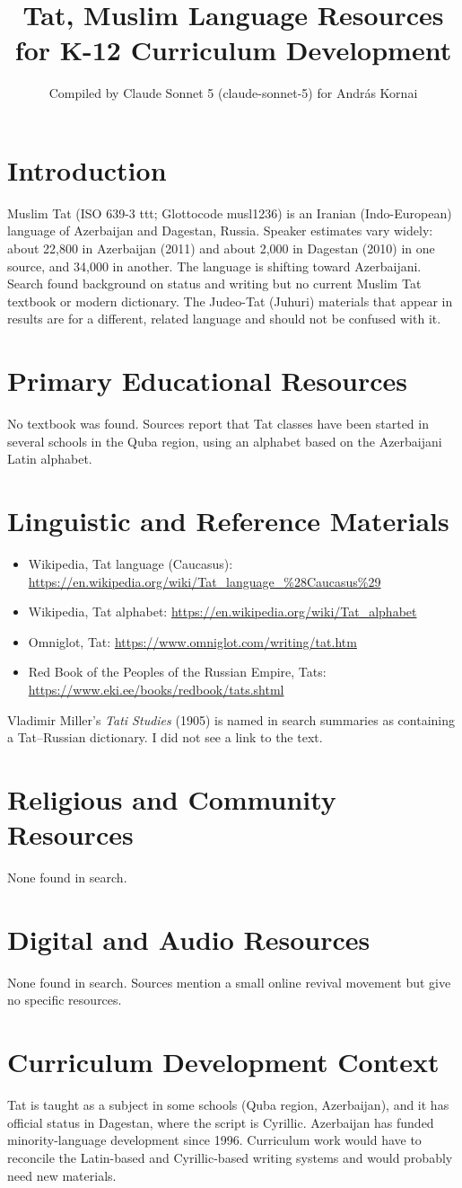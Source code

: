 \documentclass[12pt]{article}
\title{Tat, Muslim Language Resources for K-12 Curriculum Development}
\author{Compiled by Claude Sonnet 5 (claude-sonnet-5) for Andr\'as Kornai}
\date{}
\begin{document}
\maketitle
\section{Introduction}
Muslim Tat (ISO 639-3 ttt; Glottocode musl1236) is an Iranian (Indo-European) language of Azerbaijan and Dagestan, Russia. Speaker estimates vary widely: about 22,800 in Azerbaijan (2011) and about 2,000 in Dagestan (2010) in one source, and 34,000 in another. The language is shifting toward Azerbaijani. Search found background on status and writing but no current Muslim Tat textbook or modern dictionary. The Judeo-Tat (Juhuri) materials that appear in results are for a different, related language and should not be confused with it.
\section{Primary Educational Resources}
No textbook was found. Sources report that Tat classes have been started in several schools in the Quba region, using an alphabet based on the Azerbaijani Latin alphabet.
\section{Linguistic and Reference Materials}
\begin{itemize}
\item Wikipedia, Tat language (Caucasus): \url{https://en.wikipedia.org/wiki/Tat_language_%28Caucasus%29}
\item Wikipedia, Tat alphabet: \url{https://en.wikipedia.org/wiki/Tat_alphabet}
\item Omniglot, Tat: \url{https://www.omniglot.com/writing/tat.htm}
\item Red Book of the Peoples of the Russian Empire, Tats: \url{https://www.eki.ee/books/redbook/tats.shtml}
\end{itemize}
Vladimir Miller's \emph{Tati Studies} (1905) is named in search summaries as containing a Tat--Russian dictionary. I did not see a link to the text.
\section{Religious and Community Resources}
None found in search.
\section{Digital and Audio Resources}
None found in search. Sources mention a small online revival movement but give no specific resources.
\section{Curriculum Development Context}
Tat is taught as a subject in some schools (Quba region, Azerbaijan), and it has official status in Dagestan, where the script is Cyrillic. Azerbaijan has funded minority-language development since 1996. Curriculum work would have to reconcile the Latin-based and Cyrillic-based writing systems and would probably need new materials.
\end{document}
